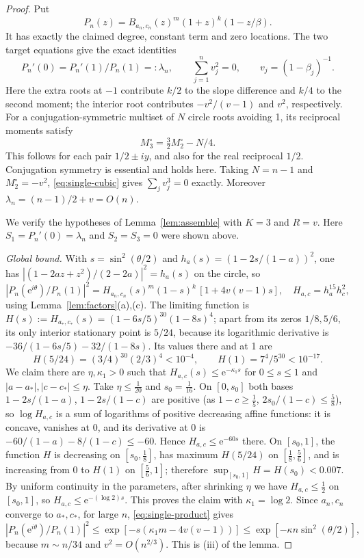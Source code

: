 \documentclass[11pt]{article}
\theoremstyle{remark}\newtheorem{remark}[theorem]{Remark}
\newcommand{\ee}{\mathrm e}
\begin{document}
\begin{proof}
Put
\[
 P_n(z)=B_{a_n,c_n}(z)^m(1+z)^k(1-z/\beta).
\]
It has exactly the claimed degree, constant term and zero locations.
The two target equations give the exact identities
\[
 P_n'(0)=P_n'(1)/P_n(1)=:\lambda_n,
 \qquad \sum_{j=1}^n v_j^2=0,
 \qquad v_j=(1-\beta_j)^{-1}.
\]
Here the extra roots at \(-1\) contribute \(k/2\) to the slope
difference and \(k/4\) to the second moment; the interior root
contributes \(-v^2/(v-1)\) and \(v^2\), respectively.
For a conjugation-symmetric multiset of \(N\) circle roots
avoiding 1, its reciprocal moments satisfy
\begin{equation}\label{eq:circle-third}
 M_3^{\circ}=\tfrac32 M_2^{\circ}-N/4.
\end{equation}
This follows for each pair \(1/2\pm iy\), and also for the real
reciprocal \(1/2\). Conjugation symmetry is essential and holds
here. Taking \(N=n-1\) and \(M_2^{\circ}=-v^2\),
\eqref{eq:single-cubic} gives \(\sum_jv_j^3=0\) exactly.
Moreover \(\lambda_n=(n-1)/2+v=O(n)\).

We verify the hypotheses of Lemma~\ref{lem:assemble} with \(K=3\) and
\(R=v\). Here \(S_1=P_n'(0)=\lambda_n\) and \(S_2=S_3=0\) were shown above.

\emph{Global bound.} With \(s=\sin^2(\theta/2)\) and
\(h_a(s)=(1-2s/(1-a))^2\), one has
\(|(1-2az+z^2)/(2-2a)|^2=h_a(s)\) on the circle, so
\begin{equation}\label{eq:single-product}
 |P_n(\ee^{i\theta})/P_n(1)|^2
 =H_{a_n,c_n}(s)^m(1-s)^k\,[1+4v(v-1)s],
 \quad
 H_{a,c}=h_a^{15}h_c^{2},
\end{equation}
using Lemma~\ref{lem:factors}(a),(c). The limiting function is
\(H(s):=H_{a_*,c_*}(s)=(1-6s/5)^{30}(1-8s)^4\); apart from its zeros \(1/8,5/6\), its only
interior stationary point is \(5/24\), because its logarithmic derivative is
\(-36/(1-6s/5)-32/(1-8s)\). Its values there and at 1 are
\[
 H(5/24)=(3/4)^{30}(2/3)^4<10^{-4},\qquad H(1)=7^4/5^{30}<10^{-17}.
\]
We claim there are \(\eta,\kappa_1>0\) such that
\(H_{a,c}(s)\le\ee^{-\kappa_1s}\) for \(0\le s\le1\) and
\(|a-a_*|,|c-c_*|\le\eta\). Take \(\eta\le\frac1{20}\) and \(s_0=\frac1{16}\).
On \([0,s_0]\) both bases \(1-2s/(1-a)\), \(1-2s/(1-c)\) are positive
(as \(1-c\ge\frac15\), \(2s_0/(1-c)\le\frac58\)), so \(\log H_{a,c}\) is a sum of logarithms of
positive decreasing affine functions: it is concave, vanishes at \(0\), and its
derivative at \(0\) is \(-60/(1-a)-8/(1-c)\le-60\). Hence
\(H_{a,c}\le\ee^{-60s}\) there. On \([s_0,1]\), the function
\(H\) is decreasing on \([s_0,\frac18]\), has maximum
\(H(5/24)\) on \([\frac18,\frac56]\), and is increasing from \(0\) to \(H(1)\)
on \([\frac56,1]\); therefore
\(\sup_{[s_0,1]}H=H(s_0)<0.007\).
By uniform continuity in the parameters, after shrinking \(\eta\) we have
\(H_{a,c}\le\frac12\) on \([s_0,1]\), so \(H_{a,c}\le\ee^{-(\log2)s}\). This proves
the claim with \(\kappa_1=\log2\). Since \(a_n,c_n\) converge to \(a_*,c_*\),
for large \(n\), \eqref{eq:single-product} gives
\[
 |P_n(\ee^{i\theta})/P_n(1)|^2\le
 \exp[-s(\kappa_1m-4v(v-1))]\le\exp[-\kappa n\sin^2(\theta/2)],
\]
because \(m\sim n/34\) and \(v^2=O(n^{2/3})\). This is (iii) of the lemma.


\end{proof}
\end{document}
